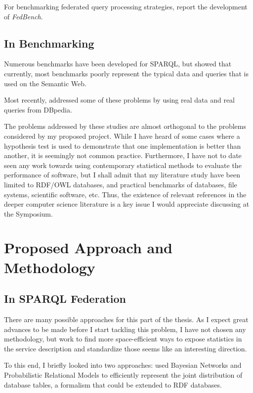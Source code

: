 \documentclass{llncs}
\begin{document}
For benchmarking federated query processing strategies,
\cite{Schmidt:2011:FBS:2063016.2063054} report the development of \emph{FedBench}.



\subsection{In Benchmarking}

Numerous benchmarks have been developed for SPARQL, but
\cite{Duan:2011:AOC:1989323.1989340} showed that currently, most
benchmarks poorly represent the typical data and queries that is used
on the Semantic Web.

Most recently, \cite{mxro:Morsey2011DBpedia} addressed some of these
problems by using real data and real queries from DBpedia.

The problems addressed by these studies are almost orthogonal to the
problems considered by my proposed project. While I have heard of some
cases where a hypothesis test is used to demonstrate that one
implementation is better than another, it is seemingly not common
practice. Furthermore, I have not to date seen any work towards using
contemporary statistical methods to evaluate the performance of
software, but I shall admit that my literature study have been limited
to RDF/OWL databases, and practical benchmarks of databases, file
systems, scientific software, etc. Thus, the existence of relevant
references in the deeper computer science literature is a key issue I
would appreciate discussing at the Symposium.


\section{Proposed Approach and Methodology}

\subsection{In SPARQL Federation}

There are many possible approaches for this part of the thesis. As I
expect great advances to be made before I start tackling this problem,
I have not chosen any methodology, but work to find more
space-efficient ways to expose statistics in the service description
and standardize those seems like an interesting direction. 

To this end, I briefly looked into two approaches:
\cite{Getoor:2001:SEU:375663.375727} used Bayesian Networks and
Probabilistic Relational Models to efficiently represent the joint
distribution of database tables, a formalism that could be extended to
RDF databases.
\end{document}
